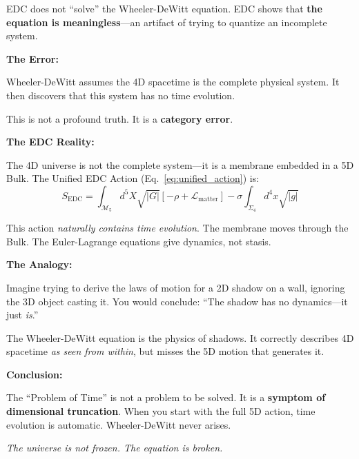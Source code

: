 \begin{tcolorbox}[colback=purple!5,colframe=purple!60!black,title=\textbf{EDC Perspective: Wheeler-DeWitt is an Artifact of a Wrong Premise}]

EDC does not ``solve'' the Wheeler-DeWitt equation. EDC shows that \textbf{the equation is meaningless}---an artifact of trying to quantize an incomplete system.

\vspace{0.3cm}
\textbf{The Error:}

Wheeler-DeWitt assumes the 4D spacetime is the complete physical system. It then discovers that this system has no time evolution.

This is not a profound truth. It is a \textbf{category error}.

\vspace{0.3cm}
\textbf{The EDC Reality:}

The 4D universe is not the complete system---it is a membrane embedded in a 5D Bulk. The Unified EDC Action (Eq.~\ref{eq:unified_action}) is:
\begin{equation}
S_{\text{EDC}} = \int_{\mathcal{M}_5} d^5X \sqrt{|G|} \left[ -\rho + \mathcal{L}_{\text{matter}} \right] - \sigma \int_{\Sigma_4} d^4x \sqrt{|g|}
\end{equation}

This action \textit{naturally contains time evolution}. The membrane moves through the Bulk. The Euler-Lagrange equations give dynamics, not stasis.

\vspace{0.3cm}
\textbf{The Analogy:}

Imagine trying to derive the laws of motion for a 2D shadow on a wall, ignoring the 3D object casting it. You would conclude: ``The shadow has no dynamics---it just \textit{is}.''

The Wheeler-DeWitt equation is the physics of shadows. It correctly describes 4D spacetime \textit{as seen from within}, but misses the 5D motion that generates it.

\vspace{0.3cm}
\textbf{Conclusion:}

The ``Problem of Time'' is not a problem to be solved. It is a \textbf{symptom of dimensional truncation}. When you start with the full 5D action, time evolution is automatic. Wheeler-DeWitt never arises.

\vspace{0.3cm}
\textit{The universe is not frozen. The equation is broken.}
\end{tcolorbox}

